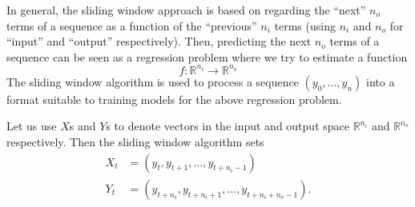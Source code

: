 \documentclass[11pt]{article}
\begin{document}
In general, the sliding window approach is based on regarding the ``next'' $n_o$ terms of a sequence as a function of the ``previous'' $n_i$ terms (using $n_i$ and $n_o$ for ``input'' and ``output'' respectively).
Then, predicting the next $n_o$ terms of a sequence can be seen as a regression problem where we try to estimate a function
\begin{equation*}
  f \colon \mathbb{R}^{n_i} \to \mathbb{R}^{n_o}
\end{equation*}
The sliding window algorithm is used to process a sequence $(y_0, \dots, y_n)$ into a format suitable to training models for the above regression problem.

Let us use $X$s and $Y$s to denote vectors in the input and output space $\mathbb{R}^{n_i}$ and $\mathbb{R}^{n_o}$ respectively.
Then the sliding window algorithm sets
\begin{align*}
  X_t &= (y_t, y_{t+1}, \dots, y_{t+n_i-1}) \\
  Y_t &= (y_{t+n_i}, y_{t+n_i+1}, \dots, y_{t+n_i+n_o-1}).
\end{align*}

\end{document}

